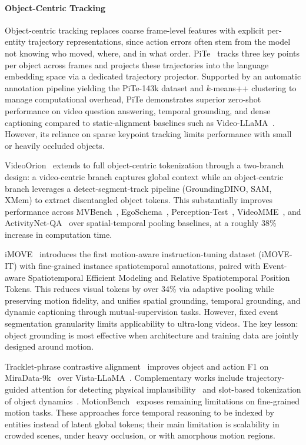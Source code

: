 \documentclass[10pt]{article} %
\begin{document}
\paragraph{Object-Centric Tracking}

Object-centric tracking replaces coarse frame-level features with explicit per-entity trajectory representations, since action errors often stem from the model not knowing who moved, where, and in what order. PiTe~\citep{Liu2024PiTePA} tracks three key points per object across frames and projects these trajectories into the language embedding space via a dedicated trajectory projector. Supported by an automatic annotation pipeline yielding the PiTe-143k dataset and $k$-means++ clustering to manage computational overhead, PiTe demonstrates superior zero-shot performance on video question answering, temporal grounding, and dense captioning compared to static-alignment baselines such as Video-LLaMA~\citep{Zhang2023VideoLLaMAAI}. However, its reliance on sparse keypoint tracking limits performance with small or heavily occluded objects.

VideoOrion~\citep{Feng2024VideoOrionTO} extends to full object-centric tokenization through a two-branch design: a video-centric branch captures global context while an object-centric branch leverages a detect-segment-track pipeline (GroundingDINO, SAM, XMem) to extract disentangled object tokens. This substantially improves performance across MVBench~\citep{li2024mvbench}, EgoSchema~\citep{mangalam2023egoschema}, Perception-Test~\citep{patraucean2023perception}, VideoMME~\citep{fu2025video}, and ActivityNet-QA~\citep{yu2019activitynet} over spatial-temporal pooling baselines, at a roughly 38\% increase in computation time.

iMOVE~\citep{Li2025iMOVEIV} introduces the first motion-aware instruction-tuning dataset (iMOVE-IT) with fine-grained instance spatiotemporal annotations, paired with Event-aware Spatiotemporal Efficient Modeling and Relative Spatiotemporal Position Tokens. This reduces visual tokens by over 34\% via adaptive pooling while preserving motion fidelity, and unifies spatial grounding, temporal grounding, and dynamic captioning through mutual-supervision tasks. However, fixed event segmentation granularity limits applicability to ultra-long videos. The key lesson: object grounding is most effective when architecture and training data are jointly designed around motion.

Tracklet-phrase contrastive alignment~\citep{Chang2025MitigatingOA} improves object and action F1 on MiraData-9k~\citep{ju2024miradata} over Vista-LLaMA~\citep{Ma2023VistallamaRH}. Complementary works include trajectory-guided attention for detecting physical implausibility~\citep{Motamed2025TRAVLAR} and slot-based tokenization of object dynamics~\citep{Xu2024SlotVLMSS}. MotionBench~\citep{Hong2025MotionBenchBA} exposes remaining limitations on fine-grained motion tasks. These approaches force temporal reasoning to be indexed by entities instead of latent global tokens; their main limitation is scalability in crowded scenes, under heavy occlusion, or with amorphous motion regions.
\end{document}

